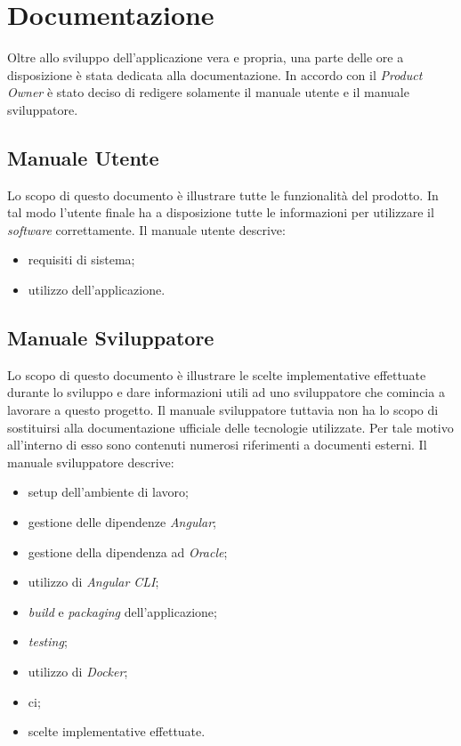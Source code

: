 \section{Documentazione}
Oltre allo sviluppo dell'applicazione vera e propria, una parte delle ore a disposizione è stata dedicata alla documentazione. In accordo con il \textit{Product Owner} è stato deciso di redigere solamente il manuale utente e il manuale sviluppatore.

\subsection{Manuale Utente}
Lo scopo di questo documento è illustrare tutte le funzionalità del prodotto. In tal modo l'utente finale ha a disposizione tutte le informazioni per utilizzare il \textit{software} correttamente.
Il manuale utente descrive:
\begin{itemize}
    \item requisiti di sistema;
    \item utilizzo dell'applicazione.
\end{itemize}

\subsection{Manuale Sviluppatore}
Lo scopo di questo documento è illustrare le scelte implementative effettuate durante lo sviluppo e dare informazioni utili ad uno sviluppatore che comincia a lavorare a questo progetto.
Il manuale sviluppatore tuttavia non ha lo scopo di sostituirsi alla documentazione ufficiale delle tecnologie utilizzate. Per tale motivo all'interno di esso sono contenuti numerosi riferimenti a documenti esterni.
Il manuale sviluppatore descrive:
\begin{itemize}
    \item setup dell'ambiente di lavoro;
    \item gestione delle dipendenze \textit{Angular};
    \item gestione della dipendenza ad \textit{Oracle};
    \item utilizzo di \textit{Angular CLI};
    \item \textit{build} e \textit{packaging} dell'applicazione;
    \item \textit{testing};
    \item utilizzo di \textit{Docker};
    \item \gls{ci};
    \item scelte implementative effettuate.
\end{itemize}

